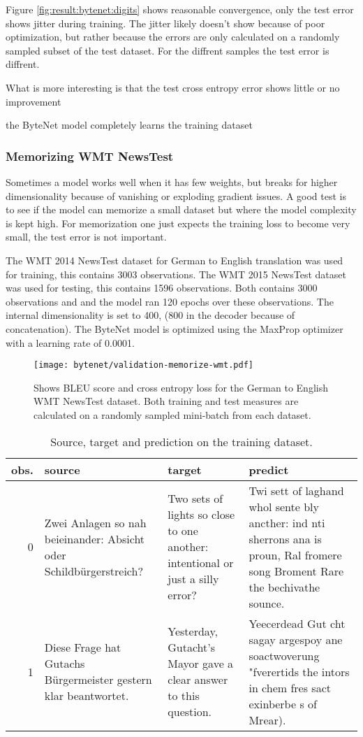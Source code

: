 Figure \ref{fig:result:bytenet:digits} shows reasonable convergence, only the test error shows jitter during training. The jitter likely doesn't show because of poor optimization, but rather because the errors are only calculated on a randomly sampled subset of the test dataset. For the diffrent samples the test error is diffrent.

What is more interesting is that the test cross entropy error shows little or no improvement   


the ByteNet model completely learns the training dataset


\subsubsection{Memorizing WMT NewsTest}

Sometimes a model works well when it has few weights, but breaks for higher dimensionality because of vanishing or exploding gradient issues. A good test is to see if the model can memorize a small dataset but where the model complexity is kept high. For memorization one just expects the training loss to become very small, the test error is not important.

The WMT 2014 NewsTest dataset for German to English translation was used for training, this contains 3003 observations. The WMT 2015 NewsTest dataset was used for testing, this contains 1596 observations. Both contains 3000 observations and and the model ran 120 epochs over these observations. The internal dimensionality is set to 400, (800 in the decoder because of concatenation). The ByteNet model is optimized using the MaxProp optimizer with a learning rate of 0.0001.

\begin{figure}[H]
    \centering
    \texttt{[image: bytenet/validation-memorize-wmt.pdf]}
    \caption{Shows BLEU score and cross entropy loss for the German to English WMT NewsTest dataset. Both training and test measures are calculated on a randomly sampled mini-batch from each dataset.}
\end{figure}

\begin{table}[H]
\centering
\begin{tabular}{r|p{3.3cm} p{3.3cm} p{3.3cm}}
	obs. & source & target & predict\\ \hline
  0  & Zwei Anlagen so nah beieinander: Absicht oder Schildbürgerstreich? & Two sets of lights so close to one another: intentional or just a silly error? & Twi sett of laghand whol sente bly ancther: ind nti sherrons ana is proun, Ral fromere song Broment Rare the bechivathe sounce. \\
  1 & Diese Frage hat Gutachs Bürgermeister gestern klar beantwortet. & Yesterday, Gutacht's Mayor gave a clear answer to this question. & Yeecerdead Gut cht sagay argespoy ane soactwoverung "fverertids the intors in chem fres sact exinberbe s of Mrear).
\end{tabular}
\caption{Source, target and prediction on the training dataset.}
\end{table}

